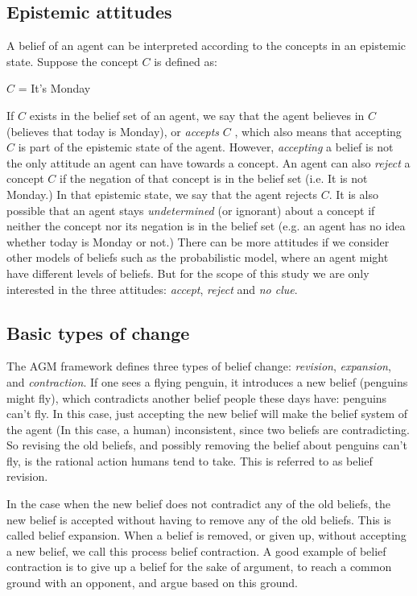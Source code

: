 \subsection{Epistemic attitudes}
\label{epistemicAttitudes}
A belief of an agent can be interpreted according to the concepts in an epistemic state. Suppose the concept $C$ is defined as:
\begin{center}
$C$ = It's Monday
\end{center}
If $C$ exists in the belief set of an agent, we say that the agent believes in $C$ (believes that today is Monday), or \textit{accepts} $C$ \cite{flux}, which also means that accepting $C$ is part of the epistemic state of the agent. However, \textit{accepting} a belief is not the only attitude an agent can have towards a concept. An agent can also \textit{reject} a concept $C$ if the negation of that concept is in the belief set (i.e. It is not Monday.) In that epistemic state, we say that the agent rejects $C$. It is also possible that an agent stays \textit{undetermined} (or ignorant) about a concept if neither the concept nor its negation is in the belief set (e.g. an agent has no idea whether today is Monday or not.) There can be more attitudes if we consider other models of beliefs such as the probabilistic model, where an agent might have different levels of beliefs. But for the scope of this study we are only interested in the three attitudes: \textit{accept}, \textit{reject} and \textit{no clue}.

\subsection{Basic types of change}
The AGM framework defines three types of belief change: \textit{revision}, \textit{expansion}, and \textit{contraction}. If one sees a flying penguin, it introduces a new belief (penguins might fly), which contradicts another belief people these days have: penguins can't fly. In this case, just accepting the new belief will make the belief system of the agent (In this case, a human) inconsistent, since two beliefs are contradicting. So revising the old beliefs, and possibly removing the belief about penguins can't fly, is the rational action humans tend to take. This is referred to as belief revision.

In the case when the new belief does not contradict any of the old beliefs, the new belief is accepted without having to remove any of the old beliefs. This is called belief expansion. When a belief is removed, or given up, without accepting a new belief, we call this process belief contraction. A good example of belief contraction is to give up a belief for the sake of argument, to reach a common ground with an opponent, and argue based on this ground.

